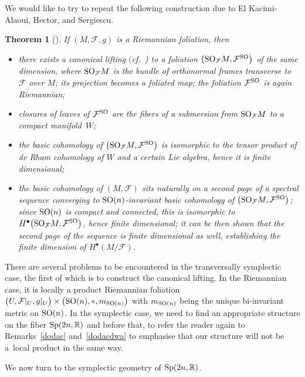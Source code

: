 \documentclass[10pt,a4paper]{amsart}
\numberwithin{equation}{section}
\newtheorem{Theorem}{Theorem}[section]
{ \theoremstyle{definition}
\newtheorem{Definition}[Theorem]{Definition}
\newtheorem{Example}[Theorem]{Example}
\newtheorem{Remark}[Theorem]{Remark} }
\begin{document}
We would like to try to repeat the following construction due to El Kacimi-Alaoui, Hector, and Sergiescu.
\begin{Theorem}[\cite{aziztopologiczny}] \label{aziz}
If $(M,\mathcal{F},g)$ is a Riemannian foliation, then
\begin{itemize}\itemsep=0pt
\item there exists a \emph{canonical lifting} $($cf.~{\rm \cite[Proposition~2.4]{molino})} to a foliation $\big({\rm SO}_{\mathcal{F}}M,\mathcal{F}^{{\rm SO}}\big)$ of the same dimension, where ${\rm SO}_{\mathcal{F}}M$ is the bundle of orthonormal frames transverse to $\mathcal{F}$ over $M$; its projection becomes a foliated map; the foliation $\mathcal{F}^{{\rm SO}}$ is again Riemannian;
\item closures of leaves of $\mathcal{F}^{{\rm SO}}$ are the fibers of a submersion from ${\rm SO}_{\mathcal{F}}M$ to a compact mani\-fold~$W$;
\item the basic cohomology of $\big({\rm SO}_{\mathcal{F}}M,\mathcal{F}^{{\rm SO}}\big)$ is isomorphic to the tensor product of de Rham cohomology of $W$ and a certain Lie algebra, hence it is finite dimensional;
\item the basic cohomology of $(M,\mathcal{F})$ sits naturally on a second page of a spectral sequence converging to ${\rm SO}(n)$-invariant basic cohomology of $\big({\rm SO}_{\mathcal{F}}M,\mathcal{F}^{{\rm SO}}\big)$; since ${\rm SO}(n)$ is compact and connected, this is isomorphic to $H^{\bullet}\big({\rm SO}_{\mathcal{F}}M,\mathcal{F}^{{\rm SO}}\big)$, hence finite dimensional; it can be then shown that the second page of the sequence is finite dimensional as well, establishing the finite dimension of $H^{\bullet}(M\slash\mathcal{F})$.
\end{itemize}
\end{Theorem}
There are several problems to be encountered in the transversally symplectic case, the first of which is to construct the canonical lifting. In the Riemannian case, it is locally a product Riemannian foliation $\big(U,\mathcal{F}|_U,g|_U\big)\times \big({\rm SO}(n),\ast,m_{{\rm SO}(n)}\big)$ with $m_{{\rm SO}(n)}$ being the unique bi-invariant metric on ${\rm SO}(n)$. In the symplectic case, we need to find an appropriate structure on the fiber ${\rm Sp}(2n,\mathbb{R})$ and before that, to refer the reader again to Remarks~\ref{dodac} and~\ref{dodacdwa} to emphasise that our structure will not be a~local product in the same way.

We now turn to the symplectic geometry of ${\rm Sp}(2n,\mathbb{R})$.
\end{document}

